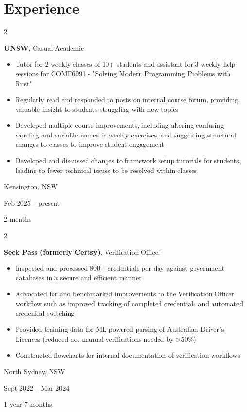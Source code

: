 \documentclass[10pt, a4paper]{article}
\newenvironment{highlights}{
    \begin{itemize}[
        topsep=0.10 cm,
        parsep=0.10 cm,
        partopsep=0pt,
        itemsep=0pt,
        leftmargin=0.4 cm + 10pt
    ]
}{
    \end{itemize}
} %
\newenvironment{twocolentry}[2][]{
    \onecolentry
    \def\secondColumn{#2}
    \setcolumnwidth{\fill, 4.5 cm}
    \begin{paracol}{2}
}{
    \switchcolumn \raggedleft \secondColumn
    \end{paracol}
    \endonecolentry
} %
\begin{document}
    
    \section{Experience}



        
        \begin{twocolentry}{
            Kensington, NSW

        Feb 2025 – present

        2 months
        }
            \textbf{UNSW}, Casual Academic
            \begin{highlights}
                \item Tutor for 2 weekly classes of 10+ students and assistant for 3 weekly help sessions for COMP6991 - "Solving Modern Programming Problems with Rust"
                \item Regularly read and responded to posts on internal course forum, providing valuable insight to students struggling with new topics
                \item Developed multiple course improvements, including altering confusing wording and variable names in weekly exercises, and suggesting structural changes to classes to improve student engagement
                \item Developed and discussed changes to framework setup tutorials for students, leading to fewer technical issues to be resolved within classes
            \end{highlights}
        \end{twocolentry}


        \vspace{0.2 cm}

        \begin{twocolentry}{
            North Sydney, NSW

        Sept 2022 – Mar 2024

        1 year 7 months
        }
            \textbf{Seek Pass (formerly Certsy)}, Verification Officer
            \begin{highlights}
                \item Inspected and processed 800+ credentials per day against government databases in a secure and efficient manner
                \item Advocated for and benchmarked improvements to the Verification Officer workflow such as improved tracking of completed credentials and automated credential switching
                \item Provided training data for ML-powered parsing of Australian Driver's Licences (reduced no. manual verifications needed by >50\%)
                \item Constructed flowcharts for internal documentation of verification workflows
            \end{highlights}
        \end{twocolentry}
\end{document}
